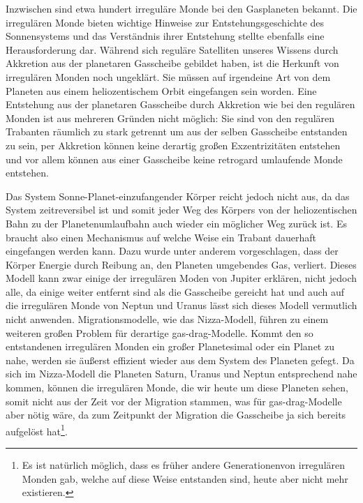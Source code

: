 \documentclass[12pt,a4paper,twoside]{article}
\renewcommand{\cite}{\citep}
\begin{document}
Inzwischen sind etwa hundert irreguläre Monde bei den Gasplaneten bekannt. %
Die irregulären Monde bieten wichtige Hinweise zur Entstehungsgeschichte des Sonnensystems und das Verständnis ihrer Entstehung stellte ebenfalls eine Herausforderung dar.
Während sich reguläre Satelliten unseres Wissens durch Akkretion aus der planetaren Gasscheibe gebildet haben, ist die Herkunft von irregulären Monden noch ungeklärt.
Sie müssen auf irgendeine Art von dem Planeten aus einem heliozentischem Orbit eingefangen sein worden. Eine Entstehung aus der planetaren Gasscheibe durch Akkretion wie bei den regulären Monden ist aus mehreren Gründen nicht möglich:
Sie sind von den regulären Trabanten räumlich zu stark getrennt um aus der selben Gasscheibe entstanden zu sein, per Akkretion können keine derartig großen Exzentrizitäten entstehen und vor allem können aus einer Gasscheibe keine retrogard umlaufende Monde entstehen\cite{Nesvorny2007}.

Das System Sonne-Planet-einzufangender Körper reicht jedoch nicht aus, da das System zeitreversibel ist und somit jeder Weg des Körpers von der heliozentischen Bahn zu der Planetenumlaufbahn auch wieder ein möglicher Weg zurück ist\cite{Nesvorny2007}.
Es braucht also einen Mechanismus auf welche Weise ein Trabant dauerhaft eingefangen werden kann. Dazu wurde unter anderem vorgeschlagen, dass der Körper Energie durch Reibung an, den Planeten umgebendes Gas, verliert. %
Dieses Modell kann zwar einige der irregulären Moden von Jupiter erklären, nicht jedoch alle, da einige weiter entfernt sind als die Gasscheibe gereicht hat und auch auf die irregulären Monde von Neptun und Uranus lässt sich dieses Modell vermutlich nicht anwenden\cite{Nesvorny2007}. %
Migrationsmodelle, wie das Nizza-Modell, führen zu einem weiteren großen Problem für derartige \glqq gas-drag\grqq-Modelle. Kommt den so entstandenen irregulären Monden ein großer Planetesimal oder ein Planet zu nahe, werden sie äußerst effizient wieder aus dem System des Planeten gefegt\cite{Nesvorny2007}. Da sich im Nizza-Modell die Planeten Saturn, Uranus und Neptun entsprechend nahe kommen, können die irregulären Monde, die wir heute um diese Planeten sehen, somit nicht aus der Zeit vor der Migration stammen\cite{Tsiganis2005,Nesvorny2007}, was für \glqq gas-drag\grqq-Modelle aber nötig wäre, da zum Zeitpunkt der Migration die Gasscheibe ja sich bereits aufgelöst hat\footnote{Es ist natürlich möglich, dass es früher andere \glqq Generationen\grqq von irregulären Monden gab, welche auf diese Weise entstanden sind, heute aber nicht mehr existieren. }. %
\end{document}
